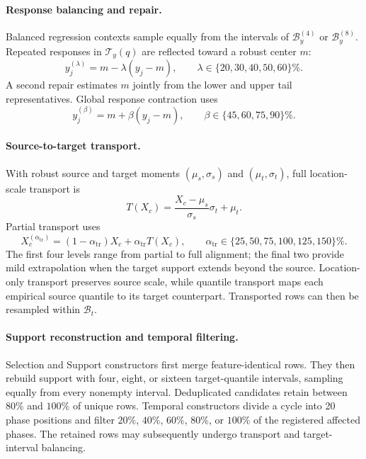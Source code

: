 \paragraph{Response balancing and repair.}
Balanced regression contexts sample equally from the intervals of
$\mathcal B_y^{(4)}$ or $\mathcal B_y^{(8)}$. Repeated responses in
$\mathcal T_y(q)$ are reflected toward a robust center $m$:
\begin{equation}
  y_j^{(\lambda)}=m-\lambda(y_j-m),\qquad
  \lambda\in\{20,30,40,50,60\}\%.
  \label{eq:tail-response-repair}
\end{equation}
A second repair estimates $m$ jointly from the lower and upper tail
representatives. Global response contraction uses
\begin{equation}
  y_j^{(\beta)}=m+\beta(y_j-m),\qquad
  \beta\in\{45,60,75,90\}\%.
  \label{eq:response-contraction}
\end{equation}

\paragraph{Source-to-target transport.}
With robust source and target moments $(\mu_s,\sigma_s)$ and
$(\mu_t,\sigma_t)$, full location-scale transport is
\begin{equation}
  T(X_c)=\frac{X_c-\mu_s}{\sigma_s}\sigma_t+\mu_t.
  \label{eq:full-context-transport}
\end{equation}
Partial transport uses
\begin{equation}
  X_c^{(\alpha_{\mathrm{tr}})}=(1-\alpha_{\mathrm{tr}})X_c
  +\alpha_{\mathrm{tr}}T(X_c),\qquad
  \alpha_{\mathrm{tr}}\in\{25,50,75,100,125,150\}\%.
  \label{eq:partial-context-transport}
\end{equation}
The first four levels range from partial to full alignment; the final two
provide mild extrapolation when the target support extends beyond the source.
Location-only transport preserves source scale, while quantile transport maps
each empirical source quantile to its target counterpart. Transported rows can
then be resampled within $\mathcal B_t$.

\paragraph{Support reconstruction and temporal filtering.}
Selection and Support constructors first merge feature-identical rows. They
then rebuild support with four, eight, or sixteen target-quantile intervals,
sampling equally from every nonempty interval. Deduplicated candidates retain
between $80\%$ and $100\%$ of unique rows. Temporal constructors divide a
cycle into 20 phase positions and filter $20\%$, $40\%$, $60\%$, $80\%$, or
$100\%$ of the registered affected phases. The retained rows may subsequently
undergo transport and target-interval balancing.

